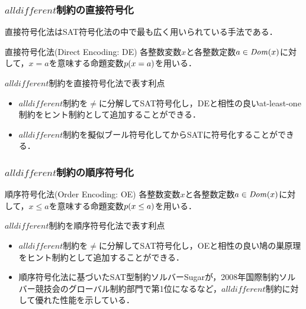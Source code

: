 \documentclass [dvipdfmx,11pt]{beamer}
\newcommand{\alldifferent}{$alldifferent$}
\begin{document}
\begin{frame}
    \frametitle{{\alldifferent}制約の直接符号化}
    直接符号化法はSAT符号化法の中で最も広く用いられている手法である．
    \begin{alertblock}{直接符号化法(Direct Encoding: DE)}
        各整数変数$x$と各整数定数$a \in {\it Dom}(x)$に対して，$x = a$を意味する命題変数\alert{\bf $p(x=a)$}を用いる．
    \end{alertblock}
    \begin{block}{{\alldifferent}制約を直接符号化法で表す利点}
        \begin{itemize}
            \item {\alldifferent}制約を$\neq$に分解してSAT符号化し，DEと相性の良いat-least-one制約をヒント制約として追加することができる．
            \item {\alldifferent}制約を擬似ブール符号化してからSATに符号化することができる．
        \end{itemize}
    \end{block}
\end{frame}



\begin{frame}
    \frametitle{{\alldifferent}制約の順序符号化}
    \begin{alertblock}{順序符号化法(Order Encoding: OE)}
        各整数変数$x$と各整数定数$a \in {\it Dom}(x)$に対して，$x \le a$を意味する命題変数\alert{\bf $p(x\le a)$}を用いる．
    \end{alertblock}
    \begin{block}{{\alldifferent}制約を順序符号化法で表す利点}
        \begin{itemize}
            \item {\alldifferent}制約を$\neq$に分解してSAT符号化し，OEと相性の良い鳩の巣原理をヒント制約として追加することができる．
        \end{itemize}
    \end{block}
    \begin{itemize}
        \item 順序符号化法に基づいたSAT型制約ソルバーSugarが，2008年国際制約ソルバー競技会のグローバル制約部門で第1位になるなど，{\alldifferent}制約に対して優れた性能を示している．
    \end{itemize}
\end{frame}
\end{document}
